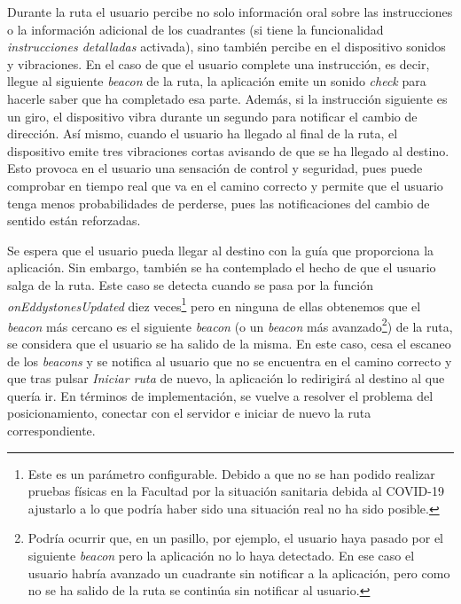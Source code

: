 \begin{itemize}
	Durante la ruta el usuario percibe no solo información oral sobre las instrucciones o la información adicional de los cuadrantes (si tiene la funcionalidad \textit{instrucciones detalladas} activada), sino también percibe en el dispositivo sonidos y vibraciones. En el caso de que el usuario complete una instrucción, es decir, llegue al siguiente \textit{beacon} de la ruta, la aplicación emite un sonido \textit{check} para hacerle saber que ha completado esa parte. Además, si la instrucción siguiente es un giro, el dispositivo vibra durante un segundo para notificar el cambio de dirección. Así mismo, cuando el usuario ha llegado al final de la ruta, el dispositivo emite tres vibraciones cortas avisando de que se ha llegado al destino. Esto provoca en el usuario una sensación de control y seguridad, pues puede comprobar en tiempo real que va en el camino correcto y permite que el usuario tenga menos probabilidades de perderse, pues las notificaciones del cambio de sentido están reforzadas.
	
	Se espera que el usuario pueda llegar al destino con la guía que proporciona la aplicación. Sin embargo, también se ha contemplado el hecho de que el usuario salga de la ruta. Este caso se detecta cuando se pasa por la función \textit{onEddystonesUpdated} diez veces\footnote{Este es un parámetro configurable. Debido a que no se han podido realizar pruebas físicas en la Facultad por la situación sanitaria debida al COVID-19 ajustarlo a lo que podría haber sido una situación real no ha sido posible.} pero en ninguna de ellas obtenemos que el \textit{beacon} más cercano es el siguiente \textit{beacon} (o un \textit{beacon} más avanzado\footnote{Podría ocurrir que, en un pasillo, por ejemplo, el usuario haya pasado por el siguiente \textit{beacon} pero la aplicación no lo haya detectado. En ese caso el usuario habría avanzado un cuadrante sin notificar a la aplicación, pero como no se ha salido de la ruta se continúa sin notificar al usuario.}) de la ruta, se considera que el usuario se ha salido de la misma. En este caso, cesa el escaneo de los \textit{beacons} y se notifica al usuario que no se encuentra en el camino correcto y que tras pulsar \textit{Iniciar ruta} de nuevo, la aplicación lo redirigirá al destino al que quería ir. En términos de implementación, se vuelve a resolver el problema del posicionamiento, conectar con el servidor e iniciar de nuevo la ruta correspondiente.
	
\end{itemize}
